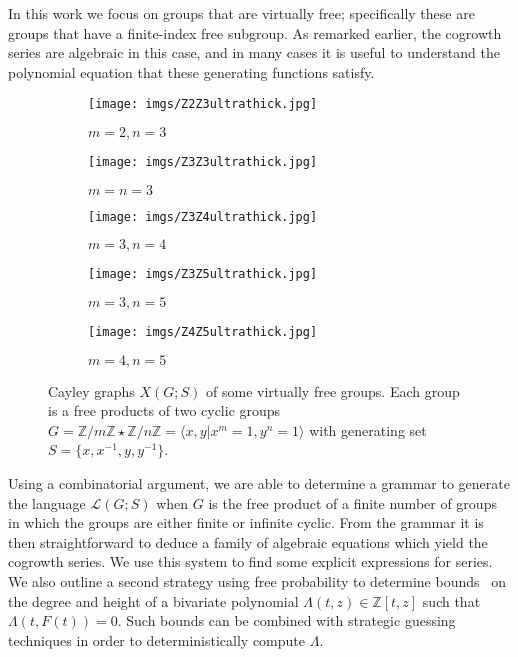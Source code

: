 \documentclass[11pt]{amsart}
\theoremstyle{definition}
\newcommand{\gen}[1]{\langle #1 \rangle}
\newcommand{\Z}{\mathbb{Z}}
\newcommand{\inv}[1]{#1^{-1}}
\begin{document}
In this work we focus on groups that are virtually free; specifically these are groups that have a finite-index free
subgroup. As remarked earlier, the cogrowth series are algebraic in this case, and in many cases it is useful to understand the polynomial equation that these generating functions
satisfy. 
\begin{figure}%
	\begin{subfigure}{.33\textwidth}
	\centering
	\texttt{[image: imgs/Z2Z3ultrathick.jpg]}
	\caption{$m=2,n=3$}
	\end{subfigure}%
	\begin{subfigure}{.33\textwidth}
	\centering
	\texttt{[image: imgs/Z3Z3ultrathick.jpg]}
	\caption{$m=n=3$}
	\end{subfigure}%
	\begin{subfigure}{.33\textwidth}
	\centering
	\texttt{[image: imgs/Z3Z4ultrathick.jpg]}
	\caption{$m=3,n=4$}
	\end{subfigure}
	
	\vspace{10pt}
	\begin{subfigure}{.5\textwidth}
	\centering	
        \texttt{[image: imgs/Z3Z5ultrathick.jpg]}
	\caption{$m=3,n=5$}
	\end{subfigure}%
	\begin{subfigure}{.5\textwidth}
	\centering
	\texttt{[image: imgs/Z4Z5ultrathick.jpg]}
	\caption{$m=4,n=5$}
	\end{subfigure}
\caption{\small Cayley graphs $X(G;S)$ of some virtually free groups. Each
  group is a free products of two cyclic groups
  $G=\Z/m\Z\star\Z/n\Z=\gen{x,y|x^m=1,y^n=1}$ with generating set
  $S=\{x,\inv{x},y,\inv{y}\}$.}
\label{fig_CG_2cylic}
\label{fig:graphs}
\end{figure}

Using a combinatorial argument, we are able to determine a grammar to
generate the language $\mathcal{L}(G;S)$ when $G$ is the free product
of a finite number of groups in which the groups are either finite or infinite cyclic. From the grammar it is
then straightforward to deduce a family of algebraic equations which yield
the cogrowth series. We use this system to find some explicit
expressions for series. We also outline a second strategy using free
probability to determine bounds~\cite{liu} on the degree and height of a
bivariate polynomial $\Lambda(t,z)\in \mathbb{Z}[t,z]$ such that
$\Lambda(t, F(t))=0$. Such bounds can be combined with strategic guessing
techniques in order to deterministically compute $\Lambda$.
\end{document}

